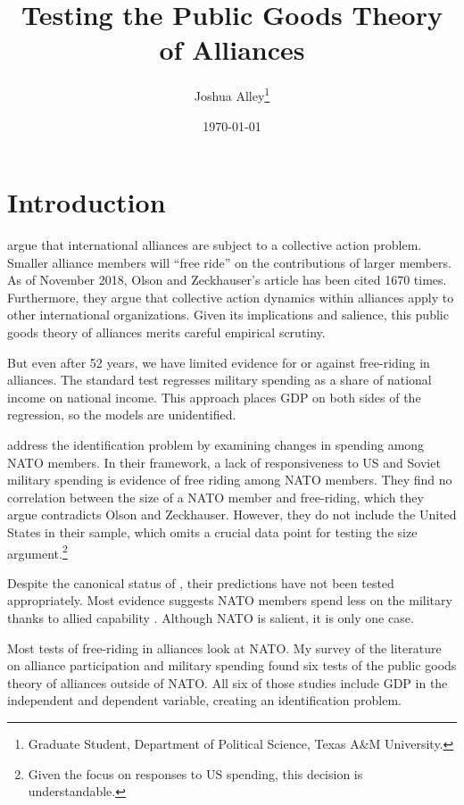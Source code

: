 \documentclass[12pt]{article}
\title{
\textbf{Testing the Public Goods Theory of Alliances}
	}
\author{Joshua Alley\footnote{Graduate Student,
Department of Political Science, Texas A\&M University.}}
\date{{\normalsize \today}}
\begin{document}
\maketitle 

\doublespace



\section{Introduction}



\citet{OlsonZeckhauser1966} argue that international alliances are subject to a collective action problem. 
Smaller alliance members will ``free ride'' on the contributions of larger members. 
As of November 2018, Olson and Zeckhauser's article has been cited 1670 times.
Furthermore, they argue that collective action dynamics within alliances apply to other international organizations. 
Given its implications and salience, this public goods theory of alliances merits careful empirical scrutiny. 


But even after 52 years, we have limited evidence for or against free-riding in alliances. 
The standard test regresses military spending as a share of national income on national income. 
This approach places GDP on both sides of the regression, so the models are unidentified. 


\citet{PluemperNeumayer2015} address the identification problem by examining changes in spending among NATO members. 
In their framework, a lack of responsiveness to US and Soviet military spending is evidence of free riding among NATO members.
They find no correlation between the size of a NATO member and free-riding, which they argue contradicts Olson and Zeckhauser. 
However, they do not include the United States in their sample, which omits a crucial data point for testing the size argument.\footnote{Given the focus on responses to US spending, this decision is understandable.}


Despite the canonical status of \citet{OlsonZeckhauser1966}, their predictions have not been tested appropriately. 
Most evidence suggests NATO members spend less on the military thanks to allied capability \citep{PluemperNeumayer2015, GeorgeSandler2017}.
Although NATO is salient, it is only one case. 


Most tests of free-riding in alliances look at NATO. 
My survey of the literature on alliance participation and military spending found six tests of the public goods theory of alliances outside of NATO. 
All six of those studies include GDP in the independent and dependent variable, creating an identification problem. 
\end{document}
